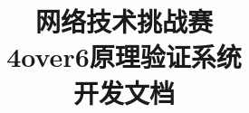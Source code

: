 \documentclass[hyperpdf,bindnopdf]{hepthesis}
\title{网络技术挑战赛\\4over6原理验证系统\\开发文档}
\author{}
\begin{document}
\begin{frontmatter}
  
\end{frontmatter}

\begin{mainmatter}
  
  
  
   
  
    
  
\end{mainmatter}

%  

%  

\end{document}
